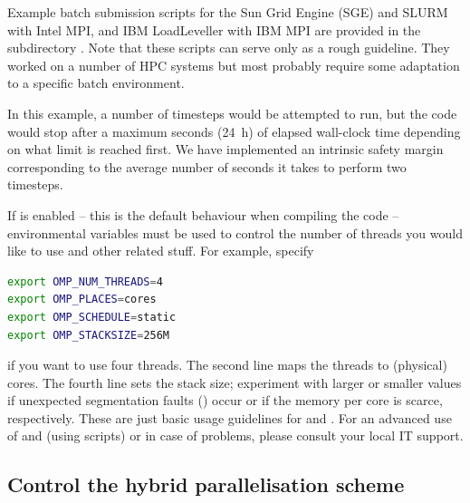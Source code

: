 \documentclass[a4paper, 11pt, DIV=11]{scrartcl}
\begin{document}
Example batch submission scripts for the Sun Grid Engine (SGE) and
SLURM with Intel MPI, and IBM LoadLeveller with IBM MPI are provided
in the subdirectory . Note that these scripts can serve only
as a rough guideline. They worked on a number of HPC systems but most
probably require some adaptation to a specific batch environment.
\par
In this example, a number of  timesteps would be attempted
to run, but the code would stop after a maximum  seconds
(\SI{24}{\hour}) of elapsed wall-clock time depending on what limit is reached
first. We have implemented an intrinsic safety margin corresponding to the
average number of seconds it takes to perform two timesteps.
\par
If \omp is enabled -- this is the default behaviour when compiling the code --
environmental variables must be used to control the number of threads you would
like to use and other related stuff. For example, specify
\begin{lstlisting}[language=bash]
export OMP_NUM_THREADS=4
export OMP_PLACES=cores
export OMP_SCHEDULE=static
export OMP_STACKSIZE=256M
\end{lstlisting}
if you want to use four \omp threads. The second line maps the threads to
(physical) cores. The fourth line sets the stack size; experiment with larger or
smaller values if unexpected segmentation faults () occur or if the
memory per core is scarce, respectively. These are just basic usage guidelines for
\mpi and \omp. For an advanced use of \mpi and \omp (\eg using 
scripts) or in case of problems, please consult your local IT support.

\subsection{Control the hybrid parallelisation scheme}
\label{sec:controlHybridScheme}
\end{document}
